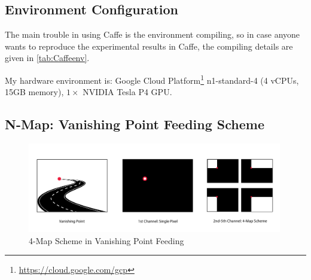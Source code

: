 \begin{spacing}{1.5}
\subsection{Environment Configuration}

\begin{table}[ht]
\centering
\caption{Dependency Environment of Caffe v1.0}
\label{tab:Caffeenv}
\end{table}

The main trouble in using Caffe is the environment compiling, so in case anyone wants to reproduce the experimental results in Caffe, the compiling details are given in \autoref{tab:Caffeenv}.

My hardware environment is: Google Cloud Platform\footnote{\url{https://cloud.google.com/gcp}} n1-standard-4 (4 vCPUs, 15GB memory), $1 \times$ NVIDIA Tesla P4 GPU.

\subsection{N-Map: Vanishing Point Feeding Scheme}
\label{subsec:fourmap}

\begin{figure}[ht]
\centering
\includegraphics[width=0.99\textwidth, fbox]{Chapter3/fourmap.pdf}
\caption{4-Map Scheme in Vanishing Point Feeding}
\label{fig:fourmap} 
\end{figure}



\end{spacing}
